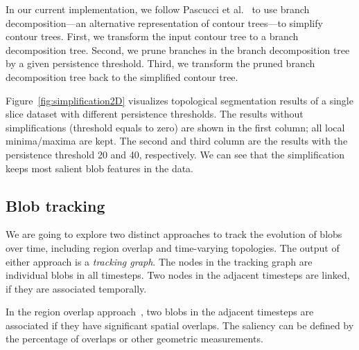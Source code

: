 In our current implementation, we follow Pascucci et al.~\cite{Pascucci2004} to use branch decomposition---an alternative representation of contour trees---to simplify contour trees.  First, we transform the input contour tree to a branch decomposition tree.  Second, we prune branches in the branch decomposition tree by a given persistence threshold.  Third, we transform the pruned branch decomposition tree back to the simplified contour tree.  

Figure~\ref{fig:simplification2D} visualizes topological segmentation results of a single slice dataset with different persistence thresholds.  The results without simplifications (threshold equals to zero) are shown in the first column; all local minima/maxima are kept.  The second and third column are the results with the persistence threshold 20 and 40, respectively.  We can see that the simplification keeps most salient blob features in the data.  




\subsection{Blob tracking}

We are going to explore two distinct approaches to track the evolution of blobs over time, including region overlap and time-varying topologies.  The output of either approach is a \emph{tracking graph}.  The nodes in the tracking graph are individual blobs in all timesteps.  Two nodes in the adjacent timesteps are linked, if they are associated temporally.  

In the region overlap approach~\cite{SilverW98}, two blobs in the adjacent timesteps are associated if they have significant spatial overlaps.  The saliency can be defined by the percentage of overlaps or other geometric measurements.  

